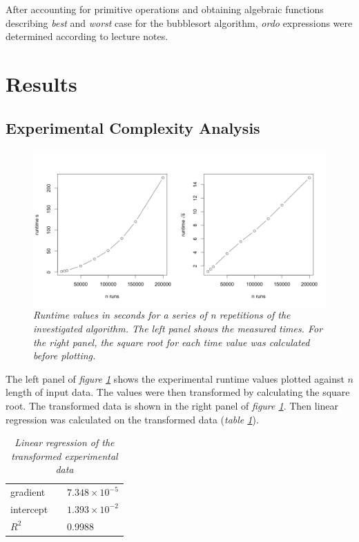 \documentclass[a4paper,11pt,twoside]{article}
\begin{document}
After accounting for primitive operations and obtaining algebraic
functions describing \emph{best} and \emph{worst} case for the bubblesort algorithm, 
\emph{ordo} expressions were determined according to lecture notes. 


\section{Results}
\subsection{Experimental Complexity Analysis}

\begin{figure} 
\includegraphics[width=\textwidth]{graph1.png}
\caption{\textit{Runtime values in seconds for a series of \textit{n}
  repetitions of the investigated algorithm. The left panel shows the
  measured times. For the right panel, the square root for each time
  value was calculated before plotting.}\label{ls:bubble}}
\label{fig:graph}
\end{figure}

The left panel of \textit{figure \ref{fig:graph}} shows the experimental
runtime values plotted against $n$ length of input data. The values
were then transformed by calculating the square root. The 
transformed data is shown in the right panel of \textit{figure 
\ref{fig:graph}}. Then linear regression was calculated on the
transformed data (\textit{table \ref{tab:regression}}).

\begin{table}[]
\caption{\textit{Linear regression of the transformed experimental data}}
\label{tab:regression}
\begin{tabular}{lll}

gradient &  & $7.348 \times 10^{-5}$ \\
intercept &  & $1.393 \times 10^{-2}$ \\
$R^2$ &  & 0.9988 \\ 
\end{tabular}
\end{table}
\end{document}
